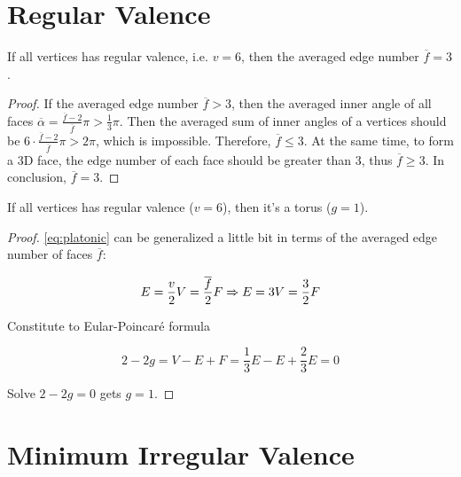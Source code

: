 \section{Regular Valence}

\begin{lemma}
    If all vertices has regular valence, i.e. $v=6$, then the averaged edge number $\overline{f} = 3$.
    \label{lemma:avg-face-edge-for-regular-valance}
\end{lemma}

\begin{proof}
    If the averaged edge number $\overline{f} > 3$, then the averaged inner angle of all faces $\overline{\alpha} = \frac{\overline{f}-2}{\overline{f}}\pi > \frac{1}{3}\pi$. Then the averaged sum of inner angles of a vertices should be $6 \cdot \frac{\overline{f} - 2}{\overline{f}}\pi > 2\pi$, which is impossible. Therefore, $\overline{f} \leq 3$. At the same time, to form a 3D face, the edge number of each face should be greater than 3, thus $\overline{f} \geq 3$. In conclusion, $\overline{f} = 3$.
\end{proof}

\begin{theorem}
    If all vertices has regular valence ($v = 6$), then it's a torus ($g = 1$).
\end{theorem}

\begin{proof}
    \autoref{eq:platonic} can be generalized a little bit in terms of the averaged edge number of faces $\overline{f}$:

    \begin{equation}
        E = \frac{v}{2} V = \frac{\overline{f}}{2} F\\
        \Rightarrow E = 3 V = \frac{3}{2} F
    \end{equation}

    Constitute to Eular-Poincar\'e formula

    \begin{equation}
        2 - 2g = V - E + F = \frac{1}{3} E - E + \frac{2}{3} E = 0
    \end{equation}

    Solve $2 - 2g = 0$ gets $g = 1$.
\end{proof}

\section{Minimum Irregular Valence}

